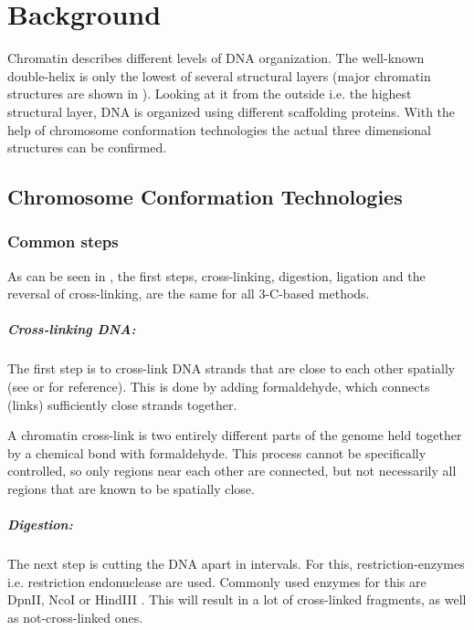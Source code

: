 \chapter{Background}\label{chap:background}



Chromatin describes different levels of DNA organization. The well-known
double-helix is only the lowest of several structural layers (major chromatin
structures are shown in ). Looking at it from the outside
i.e. the highest structural layer, DNA is organized using different scaffolding
proteins. With the help of chromosome conformation technologies the actual
three dimensional structures can be confirmed.


\section{Chromosome Conformation Technologies}\label{sec:cct}

\subsection{Common steps}\label{sec:common}

As can be seen in , the first steps, cross-linking, digestion,
ligation and the reversal of cross-linking, are the same for all 3-C-based methods.


\paragraph{Cross-linking DNA:}\label{sec:crosslinking}
The first step is to cross-link DNA strands that are close to each other
spatially (see  or  for reference). This is done by adding
formaldehyde, which connects (links) sufficiently close strands together.

A chromatin cross-link is two entirely different parts of the genome held
together by a chemical bond with formaldehyde. This process cannot be
specifically controlled, so only regions near each other are connected, but
not necessarily all regions that are known to be spatially close.


\paragraph{Digestion:}\label{sec:digestion}
The next step is cutting the DNA apart in intervals. For this,
restriction-enzymes i.e. restriction endonuclease are used. Commonly used
enzymes for this are DpnII, NcoI or HindIII \cite{lieberman2009comprehensive}.
This will result in a lot of cross-linked fragments, as well as
not-cross-linked ones.


